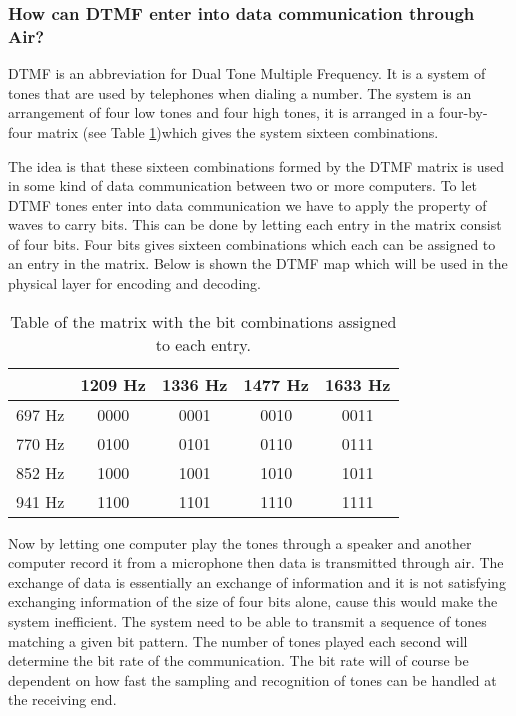 		\subsubsection{How can DTMF enter into data communication through Air?}
		DTMF is an abbreviation for Dual Tone Multiple Frequency. It is a system of tones that are used by
		telephones when dialing a number. The system is an arrangement of four low tones and four high tones,
		it is arranged in a four-by-four matrix (see Table \ref{tab:DTMF_mapping})which gives the system sixteen combinations.
		
		The idea is that these sixteen combinations formed by the DTMF matrix is used in some kind of data
		communication between two or more computers. To let DTMF tones enter into data communication we have
		to apply the property of  waves to carry bits. This can be done by letting each entry in the matrix
		consist of four bits. Four bits gives sixteen combinations which each can be assigned to an entry in
		the matrix. Below is shown the DTMF map which will be used in the physical layer for encoding and decoding.
		
		\begin{table}[htb]
			\begin{center}
				\begin{tabular}{c|c c c c}
				 & 1209 Hz & 1336 Hz & 1477 Hz & 1633 Hz \\
				\hline
				697 Hz & 0000 & 0001 & 0010 & 0011 \\
				770 Hz & 0100 & 0101 & 0110 & 0111 \\
				852 Hz & 1000 & 1001 & 1010 & 1011 \\
				941 Hz & 1100 & 1101 & 1110 & 1111 \\
				\end{tabular}
			\end{center}
			\caption{Table of the matrix with the bit combinations assigned to each entry.}
			\label{tab:DTMF_mapping}
		\end{table}
		
		Now by letting one computer play the tones through a speaker and another computer record it from
		a microphone then data is transmitted through air. The exchange of data is essentially an exchange
		of information and it is not satisfying exchanging information of the size of four bits alone,
		cause this would make the system inefficient. The system need to be able to transmit a sequence
		of tones matching a given bit pattern. The number of tones played each second will determine the
		bit rate of the communication. The bit rate will of course be dependent on how fast the sampling and
		recognition of tones can be handled at the receiving end.
		
